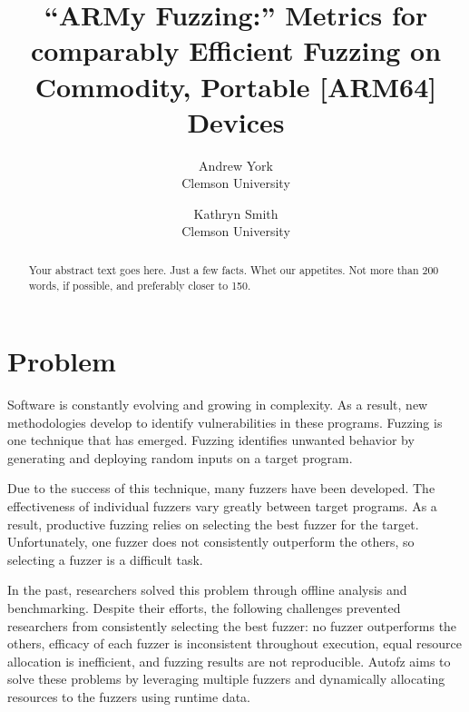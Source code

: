 

\date{}

\title{\Large \bf “ARMy Fuzzing:” Metrics for comparably Efficient Fuzzing on Commodity, Portable [ARM64] Devices}

\author{
{\rm Andrew York}\\
Clemson University
\and
{\rm Kathryn Smith}\\
Clemson University
} %

\maketitle

\begin{abstract}
Your abstract text goes here. Just a few facts. Whet our appetites.
Not more than 200 words, if possible, and preferably closer to 150.
\end{abstract}


\section{Problem}


Software is constantly evolving and growing in complexity. As a result, new methodologies develop to identify vulnerabilities in these programs. Fuzzing is one technique that has emerged. Fuzzing identifies unwanted behavior by generating and deploying random inputs on a target program.

Due to the success of this technique, many fuzzers have been developed. The effectiveness of individual fuzzers vary greatly between target programs. As a result, productive fuzzing relies on selecting the best fuzzer for the target. Unfortunately, one fuzzer does not consistently outperform the others, so selecting a fuzzer is a difficult task.

In the past, researchers solved this problem through offline analysis and benchmarking. Despite their efforts, the following challenges prevented researchers from consistently selecting the best fuzzer: no fuzzer outperforms the others, efficacy of each fuzzer is inconsistent throughout execution, equal resource allocation is inefficient, and fuzzing results are not reproducible. Autofz aims to solve these problems by leveraging multiple fuzzers and dynamically allocating resources to the fuzzers using runtime data. 

